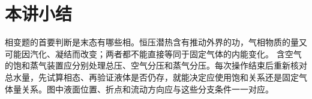 \section{本讲小结}
相变题的首要判断是末态有哪些相。恒压潜热含有推动外界的功，气相物质的量又可能因汽化、凝结而改变；两者都不能直接等同于固定气体的内能变化。
含空气的饱和蒸气装置应分别处理总压、空气分压和蒸气分压。每次操作结束后重新核对总水量，先试算相态、再验证液体是否仍存，就能决定应使用饱和关系还是固定气体量关系。图中液面位置、折点和流动方向应与这些分支条件一一对应。
